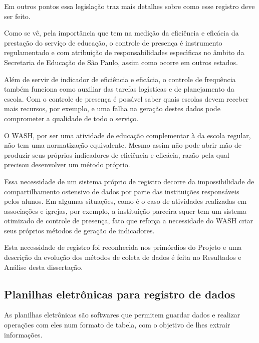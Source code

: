 \documentclass[
12pt,		%
openright,	%
twoside,  %
a4paper,			%
chapter=TITLE,		%
english,			%
french,				%
spanish,			%
brazil				%
]{USPSC-classe/USPSC}
\begin{document}
\noindent\begin{center}\mbox{\centering{}}\end{center}


Em outros pontos essa legisla\c{c}\~ao traz mais detalhes sobre como esse registro deve ser feito.


Como se v\^e, pela import\^ancia que tem na medi\c{c}\~ao da efici\^encia e efic\'acia da presta\c{c}\~ao do servi\c{c}o de educa\c{c}\~ao, o controle de presen\c{c}a \'e instrumento regulamentado e com atribui\c{c}\~ao de responsabilidades espec\'{\i}ficas no \^ambito da Secretaria de Educa\c{c}\~ao de S\~ao Paulo, assim como ocorre em outros estados.


Al\'em de servir de indicador de efici\^encia e efic\'acia, o controle de frequ\^encia tamb\'em funciona como auxiliar das tarefas log\'{\i}sticas e de planejamento da escola. Com o controle de presen\c{c}a \'e poss\'{\i}vel saber quais escolas devem receber mais recursos, por exemplo, e uma falha na gera\c{c}\~ao destes dados pode comprometer a qualidade de todo o servi\c{c}o.


O WASH, por ser uma atividade de educa\c{c}\~ao complementar \`a da escola regular, n\~ao tem uma normatiza\c{c}\~ao equivalente. Mesmo assim n\~ao pode abrir m\~ao de produzir seus pr\'oprios indicadores de efici\^encia e efic\'acia, raz\~ao pela qual  precisou desenvolver um m\'etodo pr\'oprio.


Essa necessidade de um sistema pr\'oprio de registro decorre da impossibilidade de compartilhamento ostensivo de dados por parte das institui\c{c}\~oes respons\'aveis pelos alunos. Em algumas situa\c{c}\~oes, como \'e o caso de atividades realizadas em associa\c{c}\~oes e igrejas, por exemplo, a institui\c{c}\~ao parceira squer tem um sistema otimizado de controle de presen\c{c}a, fato que refor\c{c}a a necessidade do WASH criar seus pr\'oprios m\'etodos de gera\c{c}\~ao de indicadores.


Esta necessidade de registro foi reconhecida nos prim\'ordios do Projeto e uma descri\c{c}\~ao da evolu\c{c}\~ao dos m\'etodos de coleta de dados \'e feita no Resultados e An\'alise desta disserta\c{c}\~ao.


\subsection[Planilhas eletr\^onicas para registro de dados]{Planilhas eletr\^onicas para registro de dados}\label{Planilhas eletr\^onicas para registro de dados}
As planilhas eletr\^onicas s\~ao softwares que permitem guardar  dados e realizar opera\c{c}\~oes com eles num formato de tabela, com o objetivo de lhes extrair informa\c{c}\~oes.
\end{document}

